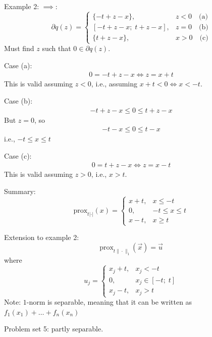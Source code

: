 \documentclass{article}
\newcommand{\x}{\vec{x}}                %
\begin{document}
Example 2:
$\implies$:
\[
    \partial q(z) = \begin{cases}
        \{-t + z - x\}, & z < 0 \quad \text{(a)} \\
        [-t + z - x;\; t + z - x], & z = 0 \quad \text{(b)} \\
        \{t + z - x\}, & x > 0 \quad \text{(c)}
    \end{cases}
\]
Must find $z$ such that $0 \in \partial q(z)$.

Case (a):
\begin{align*}
    0 = -t + z - x \iff z = x + t
\end{align*}
This is valid assuming $z < 0$, i.e., assuming $x + t < 0 \iff x < -t$.

Case (b):
\begin{align*}
    -t + z - x \leq 0 \leq t + z - x
\end{align*}
But $z = 0$, so
\begin{align*}
    -t - x \leq 0 \leq t - x
\end{align*}
i.e., $-t \leq x \leq t$

Case (c):
\begin{align*}
    0 = t + z - x \iff z = x - t
\end{align*}
This is valid assuming $z > 0$, i.e., $x > t$.

Summary:
\[
    \text{prox}_{t | \cdot |}(x) = \begin{cases}
        x + t, & x \leq -t \\
        0, & -t \leq x \leq t \\
        x - t, & x \geq t
    \end{cases}
\]

Extension to example 2:
\[
    \text{prox}_{t \|\cdot\|_1}(\x) = \vec{u}
\]
where
\[
    u_j = \begin{cases}
        x_j + t, & x_j < -t \\
        0, & x_j \in [-t;\; t] \\
        x_j - t, & x_j > t
    \end{cases}
\]
Note: $1$-norm is separable, meaning that it can be written as $f_1(x_1) + \ldots + f_n(x_n)$

Problem set 5: partly separable.
\end{document}

